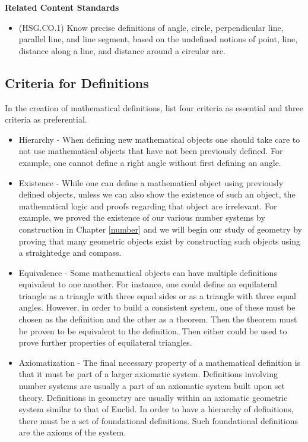 \documentclass[
]{book}
\providecommand{\tightlist}{%
  \setlength{\itemsep}{0pt}\setlength{\parskip}{0pt}}
\newenvironment{standards}{}{}
\theoremstyle{definition}
\theoremstyle{definition}
\theoremstyle{definition}
\theoremstyle{definition}
\theoremstyle{remark}
\begin{document}
\begin{standards}

\begin{center}
\textbf{Related Content Standards}

\end{center}

\begin{itemize}
\tightlist
\item
  (HSG.CO.1) Know precise definitions of angle, circle, perpendicular line, parallel line, and line segment, based on the undefined notions of point, line, distance along a line, and distance around a circular arc.
\end{itemize}

\end{standards}

\hypertarget{criteria-for-definitions}{%
\subsection{Criteria for Definitions}\label{criteria-for-definitions}}

In the creation of mathematical definitions, \citet{Dormolen2003} list four criteria as essential and three criteria as preferential.

\begin{itemize}
\item
  Hierarchy - When defining new mathematical objects one should take care to not use mathematical objects that have not been previously defined. For example, one cannot define a right angle without first defining an angle.
\item
  Existence - While one can define a mathematical object using previously defined objects, unless we can also show the existence of such an object, the mathematical logic and proofs regarding that object are irrelevant. For example, we proved the existence of our various number systems by construction in Chapter \ref{number} and we will begin our study of geometry by proving that many geometric objects exist by constructing such objects using a straightedge and compass.
\item
  Equivalence - Some mathematical objects can have multiple definitions equivalent to one another. For instance, one could define an equilateral triangle as a triangle with three equal sides or as a triangle with three equal angles. However, in order to build a consistent system, one of these must be chosen as the definition and the other as a theorem. Then the theorem must be proven to be equivalent to the definition. Then either could be used to prove further properties of equilateral triangles.
\item
  Axiomatization - The final necessary property of a mathematical definition is that it must be part of a larger axiomatic system. Definitions involving number systems are usually a part of an axiomatic system built upon set theory. Definitions in geometry are usually within an axiomatic geometric system similar to that of Euclid. In order to have a hierarchy of definitions, there must be a set of foundational definitions. Such foundational definitions are the axioms of the system.
\end{itemize}
\end{document}
